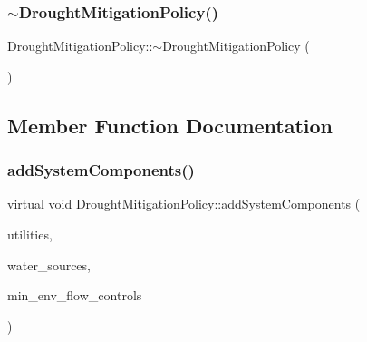\mbox{\label{classDroughtMitigationPolicy_a91ff1ca816dcb044e1e10a6c2a8e56a0_a91ff1ca816dcb044e1e10a6c2a8e56a0}} 
\subsubsection{\texorpdfstring{$\sim$\+Drought\+Mitigation\+Policy()}{~DroughtMitigationPolicy()}}
{\footnotesize\ttfamily Drought\+Mitigation\+Policy\+::$\sim$\+Drought\+Mitigation\+Policy (\begin{DoxyParamCaption}{ }\end{DoxyParamCaption})\hspace{0.3cm}{\ttfamily [virtual]}}



\subsection{Member Function Documentation}
\mbox{\label{classDroughtMitigationPolicy_aaab042a79d781afe8e08753b7012372a_aaab042a79d781afe8e08753b7012372a}} 
\subsubsection{\texorpdfstring{add\+System\+Components()}{addSystemComponents()}}
{\footnotesize\ttfamily virtual void Drought\+Mitigation\+Policy\+::add\+System\+Components (\begin{DoxyParamCaption}\item[{vector$<$ \mbox{\hyperlink{classUtility}{Utility}} $\ast$$>$}]{utilities,  }\item[{vector$<$ \mbox{\hyperlink{classWaterSource}{Water\+Source}} $\ast$$>$}]{water\+\_\+sources,  }\item[{vector$<$ \mbox{\hyperlink{classMinEnvFlowControl}{Min\+Env\+Flow\+Control}} $\ast$$>$}]{min\+\_\+env\+\_\+flow\+\_\+controls }\end{DoxyParamCaption})\hspace{0.3cm}{\ttfamily [pure virtual]}}



